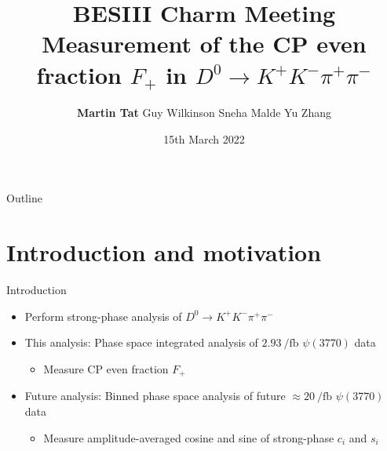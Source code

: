 \documentclass{beamer}
\title[University of Oxford]{BESIII Charm Meeting \\Measurement of the CP even fraction $F_+$ in $D^0\to K^+K^-\pi^+\pi^-$}
\author[Martin Tat]{\textbf{Martin Tat} \hspace{0.54em} Guy Wilkinson \hspace{0.54em} Sneha Malde \hspace{0.54em} Yu Zhang}
\institute{University of Oxford}
\date{15th March 2022}
\begin{document}
\begin{frame}
  \titlepage
\end{frame}

\begin{frame}{Outline}
  \tableofcontents
\end{frame}

\section{Introduction and motivation}

\begin{frame}{Introduction}
  \begin{itemize}
    \setlength\itemsep{1.5em}
    \item{Perform strong-phase analysis of $D^0\to K^+K^-\pi^+\pi^-$}
    \item{This analysis: Phase space integrated analysis of $\SI{2.93}{\per\femto\barn}$ $\psi(3770)$ data}
    \begin{itemize}
      \item{Measure CP even fraction $F_+$}
    \end{itemize}
    \item{Future analysis: Binned phase space analysis of future $\approx\SI{20}{\per\femto\barn}$ $\psi(3770)$ data}
    \begin{itemize}
      \item{Measure amplitude-averaged cosine and sine of strong-phase $c_i$ and $s_i$}
    \end{itemize}
  \end{itemize}
\end{frame}
\end{document}
